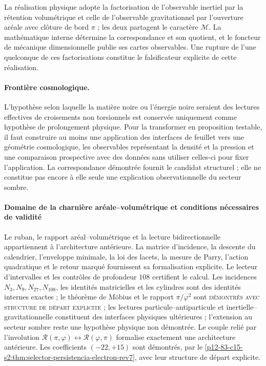 La réalisation physique adopte la factorisation de l'observable inertiel par la
rétention volumétrique et celle de l'observable gravitationnel par l'ouverture aréale
avec clôture de bord \(\pi\) ; les deux partagent le caractère \(\mathcal M\). La
mathématique interne détermine la correspondance et son quotient, et le foncteur de
mécanique dimensionnelle publie ses cartes observables. Une rupture de l'une quelconque
de ces factorisations constitue le falsificateur explicite de cette réalisation.

\paragraph{Frontière cosmologique.}
L'hypothèse selon laquelle la matière noire ou l'énergie noire seraient des lectures effectives
de croisements non torsionnels est conservée uniquement comme
hypothèse de prolongement physique. Pour la transformer en proposition
testable,
il faut construire au moins une application des interfaces de feuillet vers une
géométrie cosmologique, les observables représentant la densité et la pression et
une comparaison prospective avec des données sans utiliser celles-ci pour fixer
l'application. La correspondance démontrée fournit le candidat structurel ; elle ne
constitue pas encore à elle seule une explication observationnelle du secteur sombre.

\paragraph{Domaine de la charnière aréale–volumétrique et conditions nécessaires de validité}
Le ruban, le rapport aréal--volumétrique et la lecture bidirectionnelle appartiennent à
l'architecture antérieure. La matrice d'incidence, la descente du calendrier,
l'enveloppe minimale, la loi des lacets, la mesure de Parry, l'action
quadratique et le retour marqué fournissent sa formalisation explicite. Le
lecteur d'intervalles et les contrôles de profondeur \(108\) certifient le
calcul. Les incidences \(N_3,N_9,N_{27},N_{108}\), les identités
matricielles et les cylindres sont des identités internes exactes ; le théorème de
Möbius et le rapport
\(\pi/\varphi^2\) sont
\textsc{démontrés avec structure de départ explicite} ; les lectures
particule--antiparticule et inertielle--gravitationnelle constituent des interfaces
physiques ultérieures ; l'extension au secteur sombre reste une
hypothèse physique non démontrée. Le couple relié par l'involution
\(\mathscr R(\pi,\varphi)\leftrightarrow
\mathscr R(\varphi,\pi)\) formalise exactement une architecture antérieure. Les
coefficients \((-22,+15)\) sont démontrés, par le
\cref{p12-83-c15-s2:thm:selector-persistencia-electron-rev7}, avec leur structure de départ
explicite.

